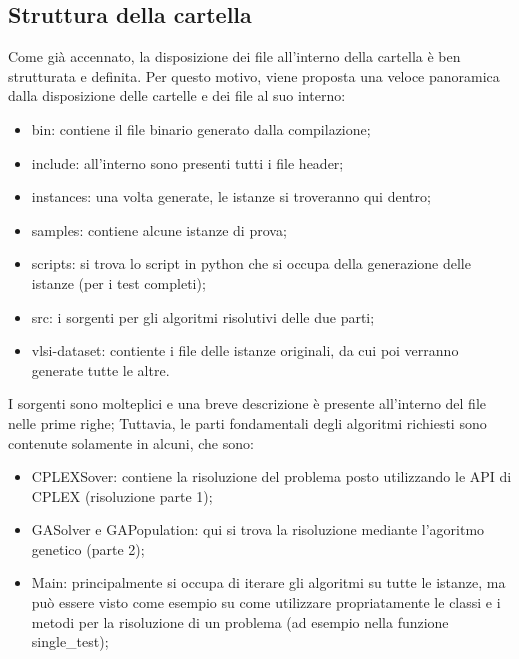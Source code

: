 \subsection{Struttura della cartella}\label{subsec:struttura}
Come già accennato, la disposizione dei file all'interno della cartella è ben strutturata e definita.
Per questo motivo, viene proposta una veloce panoramica dalla disposizione delle cartelle e dei file al suo interno:
\begin{itemize}
	\item \textsf{bin}: contiene il file binario generato dalla compilazione;
	\item \textsf{include}: all'interno sono presenti tutti i file header;
	\item \textsf{instances}: una volta generate, le istanze si troveranno qui dentro;
	\item \textsf{samples}: contiene alcune istanze di prova;
	\item \textsf{scripts}: si trova lo script in python che si occupa della generazione
	delle istanze (per i test completi);
	\item \textsf{src}: i sorgenti per gli algoritmi risolutivi delle due parti;
	\item \textsf{vlsi-dataset}: contiente i file delle istanze originali, da cui poi verranno generate tutte le altre.
\end{itemize}
%
I sorgenti sono molteplici e una breve descrizione è presente all'interno del file nelle prime righe;
Tuttavia, le parti fondamentali degli algoritmi richiesti sono contenute solamente in alcuni, che sono:
\begin{itemize}
	\item \textsf{CPLEXSover}: contiene la risoluzione del problema posto utilizzando le API di CPLEX (risoluzione parte 1);
	\item \textsf{GASolver} e \textsf{GAPopulation}: qui si trova la risoluzione mediante l'agoritmo genetico (parte 2);
	\item \textsf{Main}: principalmente si occupa di iterare gli algoritmi su tutte le istanze,
	ma può essere visto come esempio su come utilizzare propriatamente le classi e i metodi per la
	risoluzione di un problema (ad esempio nella funzione \textsf{single\_test});
\end{itemize}
%
